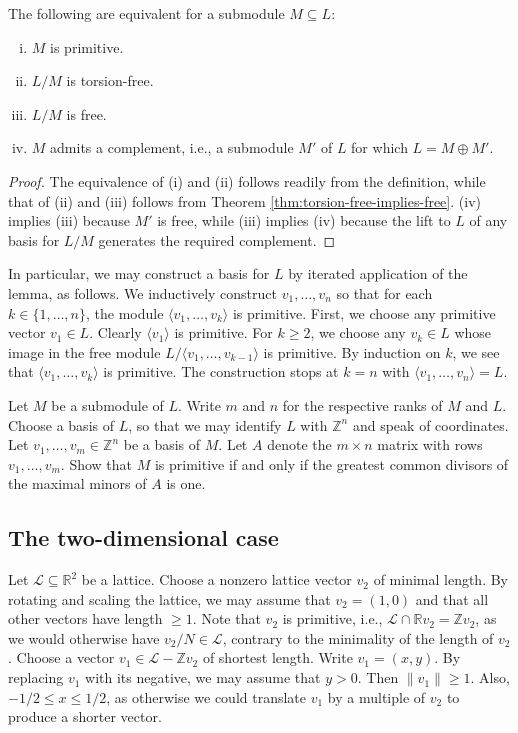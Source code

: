 \documentclass[reqno]{amsart} 
\begin{document}
\begin{lemma}
  The following are equivalent for a submodule $M \subseteq L$:
  \begin{enumerate} [(i)]
  \item $M$ is primitive.
  \item $L/M$ is torsion-free.
  \item $L/M$ is free.
  \item $M$ admits a complement, i.e., a submodule $M'$ of $L$ for which $L = M \oplus M'$.
  \end{enumerate}
\end{lemma}
\begin{proof}
  The equivalence of (i) and (ii) follows readily from the definition, while that of (ii) and (iii) follows from Theorem \ref{thm:torsion-free-implies-free}.  (iv) implies (iii) because $M'$ is free, while (iii) implies (iv) because the lift to $L$ of any basis for $L/M$ generates the required complement.
\end{proof}

In particular, we may construct a basis for $L$ by iterated application of the lemma, as follows.  We inductively construct $v_1,\dotsc,v_n$ so that for each $k \in \{1, \dotsc, n\}$, the module $\langle v_1,\dotsc,v_k \rangle$ is primitive.  First, we choose any primitive vector $v_1 \in L$.  Clearly $\langle v_1 \rangle$ is primitive.  For $k \geq 2$, we choose any $v_k \in L$ whose image in the free module $L / \langle v_1,\dotsc, v_{k-1} \rangle$ is primitive.  By induction on $k$, we see that $\langle v_1, \dotsc, v_k \rangle$ is primitive.  The construction stops at $k=n$ with $\langle v_1, \dotsc, v_n \rangle = L$.

\begin{exercise}
  Let $M$ be a submodule of $L$.  Write $m$ and $n$ for the respective ranks of $M$ and $L$.  Choose a basis of $L$, so that we may identify $L$ with $\mathbb{Z}^n$ and speak of coordinates.  Let $v_1,\dotsc,v_m \in \mathbb{Z}^n$ be a basis of $M$.  Let $A$ denote the $m \times n$ matrix with rows $v_1,\dotsc,v_m$.  Show that $M$ is primitive if and only if the greatest common divisors of the maximal minors of $A$ is one.
\end{exercise}

\subsection{The two-dimensional case} \label{sec:org729f490}
Let $\mathcal{L} \subseteq \mathbb{R}^2$ be a lattice.  Choose a nonzero lattice vector $v_2$ of minimal length.  By rotating and scaling the lattice, we may assume that $v_2 = (1,0)$ and that all other vectors have length $\geq 1$.  Note that $v_2$ is primitive, i.e., $\mathcal{L} \cap \mathbb{R} v_2 = \mathbb{Z} v_2$, as we would otherwise have $v_2/N \in \mathcal{L}$, contrary to the minimality of the length of $v_2$.  Choose a vector $v_1 \in \mathcal{L} - \mathbb{Z} v_2$ of shortest length.  Write $v_1 = (x,y)$.  By replacing $v_1$ with its negative, we may assume that $y > 0$.  Then $\|v_1\| \geq 1$.  Also, $-1/2 \leq x \leq 1/2$, as otherwise we could translate $v_1$ by a multiple of $v_2$ to produce a shorter vector.
\end{document}
